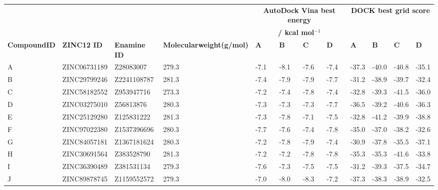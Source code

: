 \begin{table}
\centering

\begin{footnotesize}
\begin{tabular}{ p{2cm} l l p{2.5cm} l l l l l l l l }
\hline
                             &                    &                     &                                                   & \multicolumn{4}{c}{\textbf{AutoDock Vina best energy}} & \multicolumn{4}{c}{\textbf{DOCK best grid score}} \\
                             &                    &                     &                                                   & \multicolumn{4}{c}{\textbf{/ kcal mol$^{-1}$}}         & \multicolumn{4}{c}{}                              \\
\textbf{Compound\newline ID} & \textbf{ZINC12 ID} & \textbf{Enamine ID} & \textbf{Molecular\newline weight\newline (g/mol)} & \textbf{A} & \textbf{B} & \textbf{C} & \textbf{D}      & \textbf{A} & \textbf{B} & \textbf{C} & \textbf{D} \\
\hline
A & ZINC06731189 & Z28083007   & 279.3 & -7.1 & -8.1 & -7.6 & -7.4 & -37.3 & -40.0 & -40.8 & -35.1 \\
B & ZINC29799246 & Z2241108787 & 281.3 & -7.4 & -7.9 & -7.9 & -7.7 & -31.2 & -38.9 & -39.7 & -32.4 \\
C & ZINC58182552 & Z953947716  & 273.3 & -7.2 & -7.4 & -7.8 & -7.4 & -32.8 & -39.3 & -41.5 & -36.0 \\
D & ZINC03275010 & Z56813876   & 280.3 & -7.3 & -7.3 & -7.3 & -7.7 & -36.5 & -39.2 & -40.6 & -36.3 \\
E & ZINC25129280 & Z125831222  & 281.3 & -7.3 & -7.8 & -7.1 & -7.5 & -32.8 & -41.2 & -39.9 & -38.8 \\
F & ZINC97022380 & Z1537396696 & 280.3 & -7.7 & -7.6 & -7.4 & -7.8 & -35.0 & -37.0 & -38.2 & -32.6 \\
G & ZINC84057181 & Z1367181624 & 280.3 & -7.2 & -7.8 & -7.9 & -7.4 & -30.9 & -37.8 & -35.5 & -37.1 \\
H & ZINC30691564 & Z383528790  & 281.3 & -7.2 & -7.2 & -7.8 & -7.8 & -35.3 & -35.3 & -41.6 & -33.8 \\
I & ZINC36390489 & Z381531134  & 279.3 & -7.6 & -7.3 & -7.5 & -7.5 & -31.2 & -39.3 & -37.5 & -34.7 \\
J & ZINC89878745 & Z1159552572 & 279.3 & -7.0 & -8.0 & -8.3 & -7.2 & -37.3 & -38.3 & -38.9 & -32.5 \\

\end{tabular}
\end{footnotesize}
\end{table}

